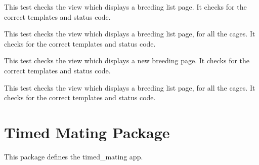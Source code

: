 \documentclass[letterpaper,10pt,english]{sphinxmanual}
\begin{document}
\begin{fulllineitems}
\begin{fulllineitems}
\end{fulllineitems}


\begin{fulllineitems}
\label{api:animal.tests.BreedingViewTests.test_breeding_list}
This test checks the view which displays a breeding list page.  It checks for the correct templates and status code.


\end{fulllineitems}


\begin{fulllineitems}
\label{api:animal.tests.BreedingViewTests.test_breeding_list_all}
This test checks the view which displays a breeding list page, for all the cages.  It checks for the correct templates and status code.


\end{fulllineitems}


\begin{fulllineitems}
\label{api:animal.tests.BreedingViewTests.test_breeding_new}
This test checks the view which displays a new breeding page.  It checks for the correct templates and status code.


\end{fulllineitems}


\begin{fulllineitems}
\label{api:animal.tests.BreedingViewTests.test_timed_mating_list}
This test checks the view which displays a breeding list page, for all the cages.  It checks for the correct templates and status code.


\end{fulllineitems}


\end{fulllineitems}



\section{Timed Mating Package}
\label{api:module-timed_mating}\label{api:timed-mating-package}
This package defines the timed\_mating app.
\end{document}

